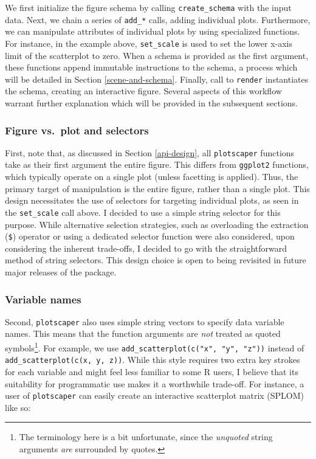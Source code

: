 \documentclass[
  openany]{book}
\theoremstyle{definition}
\theoremstyle{definition}
\theoremstyle{definition}
\theoremstyle{definition}
\theoremstyle{remark}
\begin{document}
We first initialize the figure schema by calling \texttt{create\_schema} with the input data. Next, we chain a series of \texttt{add\_*} calls, adding individual plots. Furthermore, we can manipulate attributes of individual plots by using specialized functions. For instance, in the example above, \texttt{set\_scale} is used to set the lower x-axis limit of the scatterplot to zero. When a schema is provided as the first argument, these functions append immutable instructions to the schema, a process which will be detailed in Section \ref{scene-and-schema}. Finally, call to \texttt{render} instantiates the schema, creating an interactive figure. Several aspects of this workflow warrant further explanation which will be provided in the subsequent sections.

\subsubsection{Figure vs.~plot and selectors}\label{figure-plot}

First, note that, as discussed in Section \ref{api-design}, all \texttt{plotscaper} functions take as their first argument the entire figure. This differs from \texttt{ggplot2} functions, which typically operate on a single plot (unless facetting is applied). Thus, the primary target of manipulation is the entire figure, rather than a single plot. This design necessitates the use of selectors for targeting individual plots, as seen in the \texttt{set\_scale} call above. I decided to use a simple string selector for this purpose. While alternative selection strategies, such as overloading the extraction (\texttt{\$}) operator or using a dedicated selector function were also considered, upon considering the inherent trade-offs, I decided to go with the straightforward method of string selectors. This design choice is open to being revisited in future major releases of the package.

\subsubsection{Variable names}\label{variable-names}

Second, \texttt{plotscaper} also uses simple string vectors to specify data variable names. This means that the function arguments are \emph{not} treated as quoted symbols\footnote{The terminology here is a bit unfortunate, since the \emph{unquoted} string arguments \emph{are} surrounded by quotes.}. For example, we use \texttt{add\_scatterplot(c("x",\ "y",\ "z"))} instead of \texttt{add\_scatterplot(c(x,\ y,\ z))}. While this style requires two extra key strokes for each variable and might feel less familiar to some R users, I believe that its suitability for programmatic use makes it a worthwhile trade-off. For instance, a user of \texttt{plotscaper} can easily create an interactive scatterplot matrix (SPLOM) like so:
\end{document}
